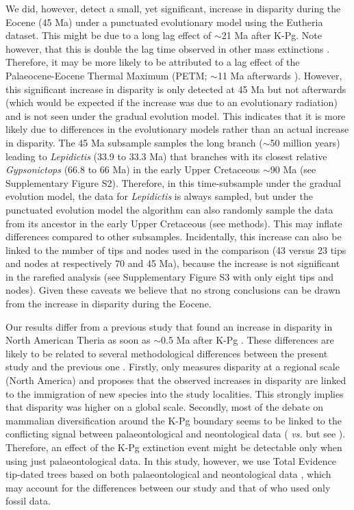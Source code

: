 \documentclass[12pt,letterpaper]{article}
\begin{document}
We did, however, detect a small, yet significant, increase in disparity during the Eocene (45 Ma) under a punctuated evolutionary model using the Eutheria dataset.
This might be due to a long lag effect of $\sim$21 Ma after K-Pg.
Note however, that this is double the lag time observed in other mass extinctions \cite{chen2012timing}.
Therefore, it may be more likely to be attributed to a lag effect of the Palaeocene-Eocene Thermal Maximum (PETM; $\sim$11 Ma afterwards \cite{bininda2007delayed}).
However, this significant increase in disparity is only detected at 45 Ma but not afterwards (which would be expected if the increase was due to an evolutionary radiation) and is not seen under the gradual evolution model.
This indicates that it is more likely due to differences in the evolutionary models rather than an actual increase in disparity.
The 45 Ma subsample samples the long branch ($\sim$50 million years) leading to \textit{Lepidictis} (33.9 to 33.3 Ma) that branches with its closest relative \textit{Gypsonictops} (66.8 to 66 Ma) in the early Upper Cretaceous $\sim$90 Ma (see Supplementary Figure S2).
Therefore, in this time-subsample under the gradual evolution model, the data for \textit{Lepidictis} is always sampled, but under the punctuated evolution model the algorithm can also randomly sample the data from its ancestor in the early Upper Cretaceous (see methods).
This may inflate differences compared to other subsamples.
Incidentally, this increase can also be linked to the number of tips and nodes used in the comparison (43 versus 23 tips and nodes at respectively 70 and 45 Ma), because the increase is not significant in the rarefied analysis (see Supplementary Figure S3 with only eight tips and nodes).
Given these caveats we believe that no strong conclusions can be drawn from the increase in disparity during the Eocene.

Our results differ from a previous study that found an increase in disparity in North American Theria as soon as $\sim$0.5 Ma after K-Pg \cite{Wilson2013}.
These differences are likely to be related to several methodological differences between the present study and the previous one \cite{Wilson2013}.
Firstly, \cite{Wilson2013} only measures disparity at a regional scale (North America) and proposes that the observed increases in disparity are linked to the immigration of new species into the study localities.
This strongly implies that disparity was higher on a global scale.
Secondly, most of the debate on mammalian diversification around the K-Pg boundary seems to be linked to the conflicting signal between palaeontological and neontological data (\cite{meredithimpacts2011} \textit{vs.} \cite{OLeary08022013} but see \cite{dosReis2014}).
Therefore, an effect of the K-Pg extinction event might be detectable only when using just palaeontological data.
In this study, however, we use Total Evidence tip-dated trees based on both palaeontological and neontological data \cite{Slater2012MEE,beckancient2014}, which may account for the differences between our study and that of \cite{Wilson2013} who used only fossil data.
\end{document}
